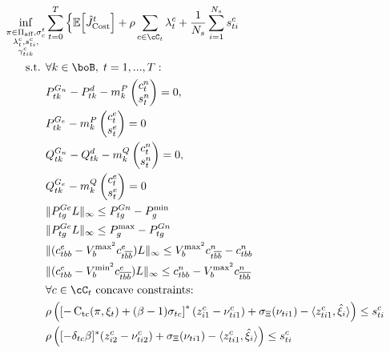 \documentclass[11pt,a4paper,oneside,openany]{book}
\DeclareMathOperator{\C}{C_{tc}}
\numberwithin{definition}{section}
\numberwithin{theorem}{section}
\numberwithin{problem}{section}
\begin{document}
\begin{align*}
\label{finite dimension convex reformulation}
\inf_{\substack{\pi \in \Pi_{\text{aff}}, \sigma_c^t \\ \lambda_{t}^c, s_{ti}^c, \\ \gamma_{tik}^c}}
& \sum_{t=0}^T \Big\{ \mathbb{E}\Big[\hat J^t_{\text{Cost}}\Big] \nonumber  + \rho  \sum_{c \in \cC_t} \lambda^c_t + \frac{1} {N_s}\sum_{i=1}^{N_s} s_{ti}^c \\
\text{s.t. } & \forall k \in \boB,\;  t = 1,...,T:  \nonumber \\
& P^{G_n}_{tk} - P_{tk}^d - m_k^P 
    \begin{pmatrix} c_t^n \\ s_t^n \end{pmatrix} = 0, \\
    &  P_{tk}^{G_e}-m_k^P  \begin{pmatrix} c_t^e \\ s_t^e 
    \end{pmatrix} = 0 \\
& Q^{G_n}_{tk} - Q_{tk}^d - m_k^Q 
    \begin{pmatrix} c_t^n \\ s_t^n \end{pmatrix} = 0, \\
&Q_{tk}^{G_e}-m_k^Q  
    \begin{pmatrix} c_t^e \\ s_t^e \end{pmatrix} = 0 \\
&\|P_{tg}^{Ge}L\|_{\infty} \leq P_{tg}^{Gn}-P_g^{\text{min}} \\
&\|P_{tg}^{Ge}L\|_{\infty} \leq P_g^{\text{max}}-P_{tg}^{Gn} \\
&\|(c^e_{tbb}-V_b^{\text{max}^2}c^e_{t\overline{bb}})L\|_{\infty} \leq V_b^{\text{max}^2}c^n_{t\overline{bb}} - c^n_{tbb} \\
&\|(c^e_{tbb}-V_b^{\text{min}^2}c^e_{\overline{tbb}})L\|_{\infty} \leq  c^n_{tbb} - V_b^{\text{max}^2}c^n_{\overline{tbb}} \\
&\forall c \in \cC_t \text{ concave constraints:} \\
& \rho\left( \left[-\C(\pi,\xi_t) + (\beta-1)\sigma_{tc}\right]^*(z_{i1}^c - \nu_{ti1}^c) + \sigma_{\Xi}(\nu_{ti1}) - \langle z_{ti1}^c, \hat \xi_i \rangle \right) \leq s_{ti}^c \nonumber \\
& \rho\left([-\delta_{tc}\beta]^*(z_{i2}^c - \nu_{ti2}^c) + \sigma_{\Xi}(\nu_{ti1}) - \langle z_{ti1}^c, \hat \xi_i \rangle \right) \leq s_{ti}^c  \nonumber\\

\end{align*}
\end{document}
